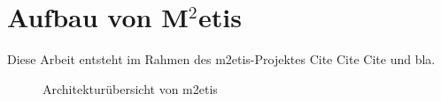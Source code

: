 \section{Aufbau von M$^2$etis}
\label{chap:grundlagen:aufbau_metis}

Diese Arbeit entsteht im Rahmen des \ac{m2etis}-Projektes Cite Cite Cite und bla.

\begin{figure}[htbp]
\centering
{}
\caption{Architekturübersicht von \ac{m2etis}}
\label{fig:metis_aufbau}
\end{figure}

\cite{Fischer2010a, Fischer2010Event}

